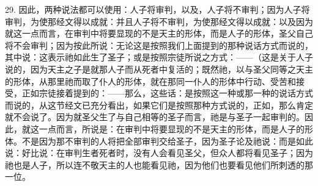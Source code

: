 29. 因此，两种说法都可以使用：人子将审判，以及，人子将不审判；因为人子将审判，为使那经文得以成就：并且人子将不审判，为使那经文得以成就：以及因为就这一点而言，在审判中将要显现的不是天主的形体，而是人子的形体，圣父自己将不会审判；因为按此所说：无论这是按照我们上面提到的那种说话方式而说的，其中说：这表示祂如此生了圣子；或是按照宗徒所说之方式：——（这是关于人子说的，因为天主之子是就那人子而从死者中复活的；既然祂，以与圣父同等之天主的形体，从那里祂而取了仆人的形体，就在那同一仆人的形体中行动、受苦和接受，正如宗徒接着提到的：——那么，这些话：是按照这一种或那一种的说话方式而说的，从这节经文已充分看出，如果它们是按照那种方式说的，正如，那么肯定就不会说了。因为就圣父生了与自己相等的圣子而言，祂是与圣子一起审判的。因此，就这一点而言，所说是：在审判中将要显现的不是天主的形体，而是人子的形体。不是因为那不审判的人将把全部审判交给圣子，因为圣子论及祂说：而是如此说：好比说：在审判生者死者时，没有人会看见圣父，但众人都将看见圣子；因为祂也是人子，所以连不敬天主的人也能看见祂，因为他们也要看见他们所刺透的那一位。\par

